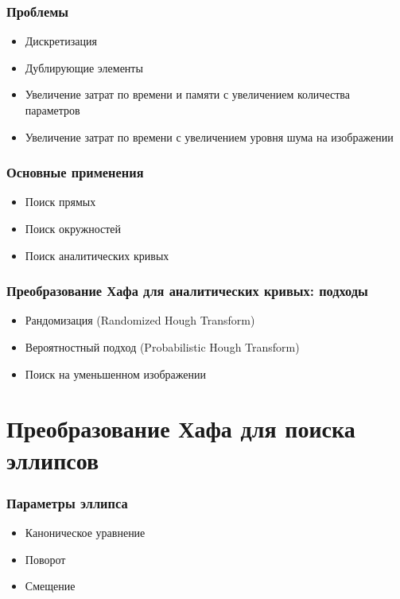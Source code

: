 \documentclass[14pt]{beamer}
\begin{document}

\begin{frame}
\frametitle{Проблемы}
\begin{itemize}
  \item Дискретизация
  \item Дублирующие элементы
  \item Увеличение затрат по времени и памяти с увеличением количества параметров 
  \item Увеличение затрат по времени с увеличением уровня шума на изображении
\end{itemize}
\end{frame}


\begin{frame}
\frametitle{Основные применения}
\begin{itemize}
  \item Поиск прямых
  \item Поиск окружностей
  \item Поиск аналитических кривых
\end{itemize}
\end{frame}


\begin{frame}
\frametitle{Преобразование Хафа для аналитических кривых: подходы}
\begin{itemize}
  \item Рандомизация (Randomized Hough Transform)
  \item Вероятностный подход (Probabilistic Hough Transform)
  \item Поиск на уменьшенном изображении
\end{itemize}
\end{frame}

\section{Преобразование Хафа для поиска эллипсов}
\begin{frame}
\frametitle{Параметры эллипса}
\begin{itemize}
  \item Каноническое уравнение
  \item Поворот
  \item Смещение
\end{itemize}
\end{frame}
\end{document}
